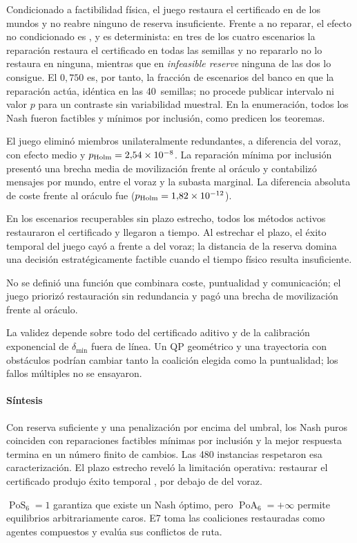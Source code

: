 Condicionado a factibilidad física, el juego restaura el certificado en \SPSixConditionalRestore{} de los mundos y no reabre ninguno de reserva insuficiente. Frente a no reparar, el efecto no condicionado es \SPSixHOneEffect{}, y es determinista: en tres de los cuatro escenarios la reparación restaura el certificado en todas las semillas y no repararlo no lo restaura en ninguna, mientras que en \emph{infeasible reserve} ninguna de las dos lo consigue. El $0{,}750$ es, por tanto, la fracción de escenarios del banco en que la reparación actúa, idéntica en las 40~semillas; no procede publicar intervalo ni valor $p$ para un contraste sin variabilidad muestral. En la enumeración, todos los Nash fueron factibles y mínimos por inclusión, como predicen los teoremas.

El juego eliminó miembros unilateralmente redundantes, a diferencia del voraz, con efecto medio \SPSixHTwoEffect{} y $p_{\mathrm{Holm}}=2{,}54\times10^{-8}$. La reparación mínima por inclusión presentó una brecha media de movilización \SPSixPotentialGap{} frente al oráculo y contabilizó \SPSixPotentialMessages{} mensajes por mundo, entre el voraz y la subasta marginal. La diferencia absoluta de coste frente al oráculo fue \SPSixHThreeEffect{} ($p_{\mathrm{Holm}}=1{,}82\times10^{-12}$).

En los escenarios recuperables sin plazo estrecho, todos los métodos activos restauraron el certificado y llegaron a tiempo. Al estrechar el plazo, el éxito temporal del juego cayó a \SPSixTightPotentialSuccess{} frente a \SPSixTightGreedySuccess{} del voraz; la distancia de la reserva domina una decisión estratégicamente factible cuando el tiempo físico resulta insuficiente.


No se definió una función que combinara coste, puntualidad y comunicación; el juego priorizó restauración sin redundancia y pagó una brecha de movilización frente al oráculo.

La validez depende sobre todo del certificado aditivo y de la calibración exponencial de $\delta_{\min}$ fuera de línea. Un QP geométrico y una trayectoria con obstáculos podrían cambiar tanto la coalición elegida como la puntualidad; los fallos múltiples no se ensayaron.

\paragraph{Síntesis}

Con reserva suficiente y una penalización por encima del umbral, los Nash puros coinciden con reparaciones factibles mínimas por inclusión y la mejor respuesta termina en un número finito de cambios. Las 480 instancias respetaron esa caracterización. El plazo estrecho reveló la limitación operativa: restaurar el certificado produjo éxito temporal \SPSixTightPotentialSuccess{}, por debajo de \SPSixTightGreedySuccess{} del voraz.

$\operatorname{PoS}_6=1$ garantiza que existe un Nash óptimo, pero $\operatorname{PoA}_6=+\infty$ permite equilibrios arbitrariamente caros. E7 toma las coaliciones restauradas como agentes compuestos y evalúa sus conflictos de ruta.
